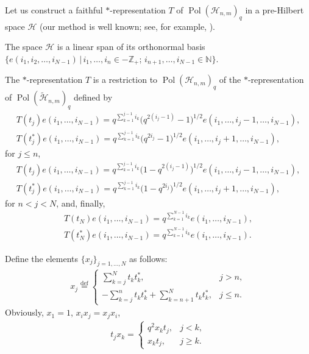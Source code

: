 \documentclass[pdftex]{sigma}
\begin{document}
Let us construct a faithful $*$-representation $T$ of $\operatorname{Pol}(\mathscr{H}_{n,m})_q$ in a
pre-Hilbert space $\mathscr{H}$ (our method is well known; see, for example, \cite{polmat}).

The space $\mathscr{H}$ is a linear span of its orthonormal basis
$\{e(i_1,i_2,\ldots,i_{N-1})\, |\,i_1,\ldots,i_n\in-\mathbb{Z}_+$; $i_{n+1}, \ldots,i_{N-1}\in\mathbb{N}\}$.

The $*$-representation $T$ is a restriction to $\operatorname{Pol}(\mathscr{H}_{n,m})_q$ of the
$*$-representation of $\operatorname{Pol}(\widetilde{\mathscr{H}}_{n,m})_q$ def\/ined by
\begin{gather*}
T(t_j)e(i_1,\ldots,i_{N-1})  = q^{\sum\limits_{k=1}^{j-1}i_k} \big(q^{2(i_j-1)}-1\big)^{1/2}
e(i_1,\ldots,i_j-1,\ldots,i_{N-1}),
\\ T(t_j^*)e(i_1,\ldots,i_{N-1})  =
q^{\sum\limits_{k=1}^{j-1}i_k} \big(q^{2i_j}-1\big)^{1/2} e(i_1,\ldots,i_j+1,\ldots,i_{N-1}),
\end{gather*}
for $j\le n$,
\begin{gather*}
T(t_j)e(i_1,\ldots,i_{N-1})  = q^{\sum\limits_{k=1}^{j-1}i_k} \big(1-q^{2(i_j-1)}\big)^{1/2}
e(i_1,\ldots,i_j-1,\ldots,i_{N-1}),
\\ T(t_j^*)e(i_1,\ldots,i_{N-1})  =
q^{\sum\limits_{k=1}^{j-1}i_k} \big(1-q^{2i_j}\big)^{1/2} e(i_1,\ldots,i_j+1,\ldots,i_{N-1}),
\end{gather*}
for $n<j<N$, and, f\/inally,
\begin{gather*}
T(t_N)e(i_1,\ldots,i_{N-1})  = q^{\sum\limits_{k=1}^{N-1}i_k}e(i_1,\ldots,i_{N-1}),
\\ T(t_N^*)e(i_1,\ldots,i_{N-1})  =
q^{\sum\limits_{k=1}^{N-1}i_k}e(i_1,\ldots,i_{N-1}).
\end{gather*}

Def\/ine the elements $\{x_j\}_{j=1,\ldots,N}$ as follows:
\begin{gather}\label{x_j}
x_j\overset{\mathrm{def}}{=}
\begin{cases}
\sum\limits_{k=j}^Nt_kt_k^*, & j>n,
\\ -\sum\limits_{k=j}^nt_kt_k^*+\sum\limits_{k=n+1}^Nt_kt_k^*, & j\le n.
\end{cases}
\end{gather}
Obviously, $x_1=1$, $x_ix_j=x_jx_i$,
\begin{gather}\label{t_jx_k}
t_jx_k=
\begin{cases}
q^2x_kt_j, & j<k,
\\ x_kt_j, & j\ge k.
\end{cases}
\end{gather}
\end{document}
